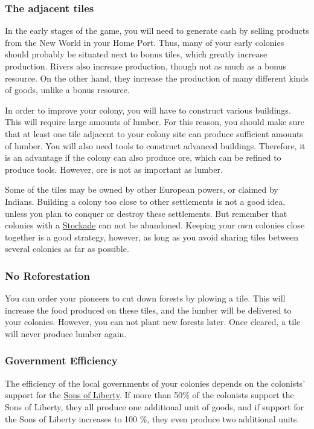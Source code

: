 \documentclass[12pt]{article}
\begin{document}
\hypertarget{The adjacent tiles}{\subsubsection{The adjacent tiles}}

In the early stages of the game, you will need to generate cash by
selling products from the New World in your Home Port. Thus, many of
your early colonies should probably be situated next to bonus tiles,
which greatly increase production. Rivers also increase production,
though not as much as a bonus resource. On the other hand, they
increase the production of many different kinds of goods, unlike a
bonus resource.

In order to improve your colony, you will have to construct various
buildings. This will require large amounts of lumber. For this reason,
you should make sure that at least one tile adjacent to your colony
site can produce sufficient amounts of lumber. You will also need
tools to construct advanced buildings. Therefore, it is an advantage
if the colony can also produce ore, which can be refined to produce
tools. However, ore is not as important as lumber.

Some of the tiles may be owned by other European powers, or claimed by
Indians. Building a colony too close to other settlements is not a
good idea, unless you plan to conquer or destroy these settlements.
But remember that colonies with a \hyperlink{Stockade}{Stockade} can
not be abandoned.  Keeping your own colonies close together is a good
strategy, however, as long as you avoid sharing tiles between several
colonies as far as possible.


\hypertarget{No Reforestation}{\subsubsection{No Reforestation}}

You can order your pioneers to cut down forests by plowing a tile.
This will increase the food produced on these tiles, and the lumber
will be delivered to your colonies. However, you can not plant new
forests later. Once cleared, a tile will never produce lumber again.


\hypertarget{Government Efficiency}{\subsubsection{Government Efficiency}}

The efficiency of the local governments of your colonies depends on
the colonists' support for the \hyperlink{Sons of Liberty}{Sons of
  Liberty}. If more than 50\% of the colonists support the Sons of
Liberty, they all produce one additional unit of goods, and if support
for the Sons of Liberty increases to 100 \%, they even produce two
additional units. 
\end{document}
